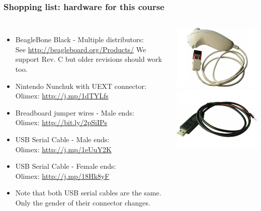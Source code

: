 \begin{frame}
\frametitle{Shopping list: hardware for this course}
  \begin{columns}
    \footnotesize
    \begin{itemize}
      \item BeagleBone Black - Multiple distributors: \\
	    See \url{http://beagleboard.org/Products/}
	    We support Rev. C but older revisions should work too.
      \item Nintendo Nunchuk with UEXT connector: \\
            Olimex: \url{http://j.mp/1dTYLfs}
      \item Breadboard jumper wires - Male ends: \\
	    Olimex: \url{http://bit.ly/2pSiIPs}
      \item USB Serial Cable - Male ends: \\
	    Olimex: \url{http://j.mp/1eUuY2K}
      \item USB Serial Cable - Female ends: \\
	    Olimex: \url{http://j.mp/18Hk8yF}
      \item Note that both USB serial cables are the same.\\
            Only the gender of their connector changes.
    \end{itemize}
    \includegraphics[height=0.25\textheight]{slides/kernel-shopping-list/nunchuk.jpg} \\
    \includegraphics[height=0.20\textheight]{slides/kernel-shopping-list/usb-serial-cable-male.jpg} \\

\end{columns}
\end{frame}
